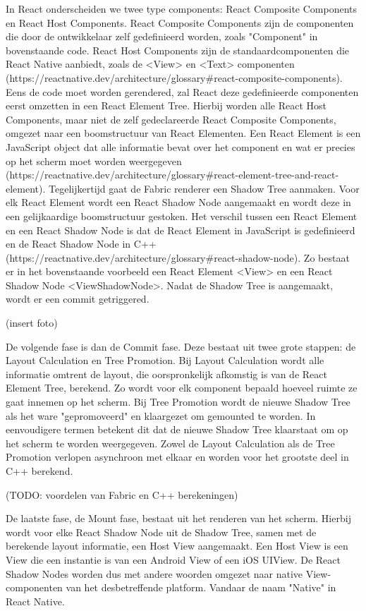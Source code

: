 In React onderscheiden we twee type components: React Composite Components en React Host Components. React Composite Components zijn de componenten die door de ontwikkelaar zelf gedefinieerd worden, zoals "Component" in bovenstaande code. React Host Components zijn de standaardcomponenten die React Native aanbiedt, zoals de <View> en <Text> componenten (https://reactnative.dev/architecture/glossary#react-composite-components). Eens de code moet worden gerendered, zal React deze gedefinieerde componenten eerst omzetten in een React Element Tree. Hierbij worden alle React Host Components, maar niet de zelf gedeclareerde React Composite Components, omgezet naar een boomstructuur van React Elementen. Een React Element is een JavaScript object dat alle informatie bevat over het component en wat er precies op het scherm moet worden weergegeven (https://reactnative.dev/architecture/glossary#react-element-tree-and-react-element). Tegelijkertijd gaat de Fabric renderer een Shadow Tree aanmaken. Voor elk React Element wordt een React Shadow Node aangemaakt en wordt deze in een gelijkaardige boomstructuur gestoken. Het verschil tussen een React Element en een React Shadow Node is dat de React Element in JavaScript is gedefinieerd en de React Shadow Node in C++ (https://reactnative.dev/architecture/glossary#react-shadow-node). Zo bestaat er in het bovenstaande voorbeeld een React Element <View> en een React Shadow Node <ViewShadowNode>. Nadat de Shadow Tree is aangemaakt, wordt er een commit getriggered.

(insert foto)

De volgende fase is dan de Commit fase. Deze bestaat uit twee grote stappen: de Layout Calculation en Tree Promotion. Bij Layout Calculation wordt alle informatie omtrent de layout, die oorspronkelijk afkomstig is van de React Element Tree, berekend. Zo wordt voor elk component bepaald hoeveel ruimte ze gaat innemen op het scherm. Bij Tree Promotion wordt de nieuwe Shadow Tree als het ware "gepromoveerd" en klaargezet om gemounted te worden. In eenvoudigere termen betekent dit dat de nieuwe Shadow Tree klaarstaat om op het scherm te worden weergegeven. Zowel de Layout Calculation als de Tree Promotion verlopen asynchroon met elkaar en worden voor het grootste deel in C++ berekend.

(TODO: voordelen van Fabric en C++ berekeningen)

De laatste fase, de Mount fase, bestaat uit het renderen van het scherm. Hierbij wordt voor elke React Shadow Node uit de Shadow Tree, samen met de berekende layout informatie, een Host View aangemaakt. Een Host View is een View die een instantie is van een Android View of een iOS UIView. De React Shadow Nodes worden dus met andere woorden omgezet naar native View-componenten van het desbetreffende platform. Vandaar de naam "Native" in React Native.

